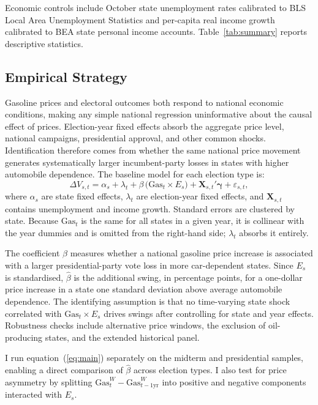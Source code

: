 \documentclass[12pt]{article}
\begin{document}
Economic controls include October state unemployment rates calibrated to BLS Local Area Unemployment Statistics and per-capita real income growth calibrated to BEA state personal income accounts. Table~\ref{tab:summary} reports descriptive statistics.

\subsection{Empirical Strategy}

Gasoline prices and electoral outcomes both respond to national economic conditions, making any simple national regression uninformative about the causal effect of prices. Election-year fixed effects absorb the aggregate price level, national campaigns, presidential approval, and other common shocks. Identification therefore comes from whether the same national price movement generates systematically larger incumbent-party losses in states with higher automobile dependence. The baseline model for each election type is:
\begin{equation}
  \Delta V_{s,t} = \alpha_s + \lambda_t
  + \beta\,\bigl(\mathrm{Gas}_{t} \times E_s\bigr)
  + \mathbf{X}_{s,t}'\boldsymbol{\gamma}
  + \varepsilon_{s,t},
  \label{eq:main}
\end{equation}
where $\alpha_s$ are state fixed effects, $\lambda_t$ are election-year fixed effects, and $\mathbf{X}_{s,t}$ contains unemployment and income growth. Standard errors are clustered by state. Because $\mathrm{Gas}_t$ is the same for all states in a given year, it is collinear with the year dummies and is omitted from the right-hand side; $\lambda_t$ absorbs it entirely.

The coefficient $\beta$ measures whether a national gasoline price increase is associated with a larger presidential-party vote loss in more car-dependent states. Since $E_s$ is standardised, $\hat\beta$ is the additional swing, in percentage points, for a one-dollar price increase in a state one standard deviation above average automobile dependence. The identifying assumption is that no time-varying state shock correlated with $\mathrm{Gas}_t\times E_s$ drives swings after controlling for state and year effects. Robustness checks include alternative price windows, the exclusion of oil-producing states, and the extended historical panel.

I run equation~(\ref{eq:main}) separately on the midterm and presidential samples, enabling a direct comparison of $\hat\beta$ across election types. I also test for price asymmetry by splitting $\mathrm{Gas}^{W}_{t} - \mathrm{Gas}^{W}_{t-1\text{yr}}$ into positive and negative components interacted with $E_s$.
\end{document}
